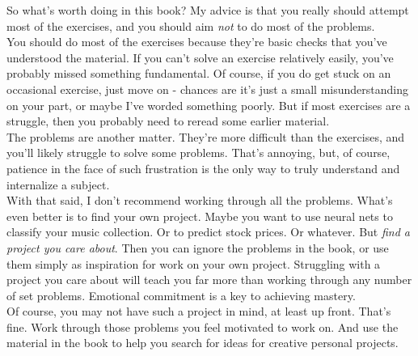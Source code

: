 So what's worth doing in this book? My advice is that you really should attempt most of the exercises, and you should aim \textit{not} to do most of the problems.\\

You should do most of the exercises because they're basic checks that you've understood the material. If you can't solve an exercise relatively easily, you've probably missed something fundamental. Of course, if you do get stuck on an occasional exercise, just move on - chances are it's just a small misunderstanding on your part, or maybe I've worded something poorly. But if most exercises are a struggle, then you probably need to reread some earlier material.\\

The problems are another matter. They're more difficult than the exercises, and you'll likely struggle to solve some problems. That's annoying, but, of course, patience in the face of such frustration is the only way to truly understand and internalize a subject.\\

With that said, I don't recommend working through all the problems. What's even better is to find your own project. Maybe you want to use neural nets to classify your music collection. Or to predict stock prices. Or whatever. But \textit{find a project you care about}. Then you can ignore the problems in the book, or use them simply as inspiration for work on your own project. Struggling with a project you care about will teach you far more than working through any number of set problems. Emotional commitment is a key to achieving mastery.\\

Of course, you may not have such a project in mind, at least up front. That's fine. Work through those problems you feel motivated to work on. And use the material in the book to help you search for ideas for creative personal projects.

\newpage